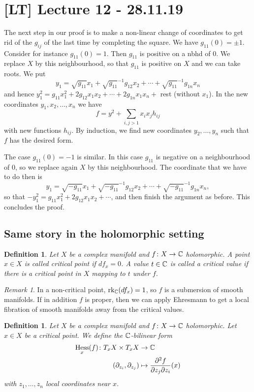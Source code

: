 \documentclass[A4paper, british, reqno]{amsart}
\theoremstyle{darkgreentheorem}
\theoremstyle{darkbluedefinition}
\newtheorem{defn}[thm]{Definition}
\theoremstyle{darkredexample}
\theoremstyle{remark}
\newtheorem{rem}[thm]{Remark}
\DeclareMathOperator{\rk}{rk}
\DeclareMathOperator{\Hess}{Hess}
\newcommand{\1}{\mathbbm{1}}
\begin{document}
\section{[LT] Lecture 12 - 28.11.19}

The next step in our proof is to make a non-linear change of coordinates to get rid of the $g_{ij}$ of the last time by completing the square.
We have $g_{11}(0)=\pm 1$.
Consider for instance $g_{11}(0)=1$.
Then $g_{11}$ is positive on a nbhd of $0$.
We replace $X$ by this neighbourhood, so that $g_{11}$ is positive on $X$ and we can take roots.
We put
\[ y_{1}=\sqrt{g_{11}}x_{1}+\sqrt{g_{11}}^{-1}g_{12}x_{2}+\cdots +\sqrt{g_{11}}^{-1}g_{1n}x_{n} \]
and hence $y_{1}^{2}=g_{11}x_{1}^{2}+2g_{12}x_{1}x_{2}+\cdots +2g_{1n}x_{1}x_{n}+$ rest (without $x_{1}$).
In the new coordinates $y_{1},x_{2},\ldots,x_{n}$ we have
\[ f=y^{2}+\sum_{i,j>1} x_{i}x_{j}h_{ij} \]
with new functions $h_{ij}$.
By induction, we find new coordinates $y_{2},\ldots,y_{n}$ such that $f$ has the desired form.

The case $g_{11}(0)=-1$ is similar.
In this case $g_{11}$ is negative on a neighbourhood of $0$, so we replace again $X$ by this neighbourhood.
The coordinate that we have to do then is
\[ y_{1}=\sqrt{-g_{11}}x_{1}+\sqrt{-g_{11}}^{-1}g_{12}x_{2}+\cdots +\sqrt{-g_{11}}^{-1}g_{1n}x_{n}, \]
so that $-y_{1}^{2}=g_{11}x_{1}^{2}+2g_{12}x_{1}x_{2}+\cdots$, and then finish the argument as before.
This concludes the proof.

\subsection{Same story in the holomorphic setting}

\begin{defn}
    Let $X$ be a complex manifold and $f\colon X\to \mathbb{C}$ holomorphic.
    A point $x\in X$ is called \textit{critical point} if $df_{x}=0$.
    A value $t\in \mathbb{C}$ is called a \textit{critical value} if there is a critical point in $X$ mapping to $t$ under $f$.
\end{defn}

\begin{rem}
    In a non-critical point, $\rk_{\C}(df_{x})=1$, so $f$ is a submersion of smooth manifolds.
    If in addition $f$ is proper, then we can apply Ehresmann to get a local fibration of smooth manifolds away from the critical values.
\end{rem}

\begin{defn}
    Let $X$ be a complex manifold and $f\colon X\to \mathbb{C}$ holomorphic.
    Let $x\in X$ be a critical point.
    We define the $\mathbb{C}$-bilinear form
    \begin{align*}
	\Hess_{x}(f)\colon T_{x}X\times T_{x}X & \to \C \\
	(\partial_{z_{i}},\partial_{z_{j}}) & \mapsto \frac{\partial^{2} f}{\partial z_{j}\partial z_{i}}(x)
    \end{align*}
    with $z_{1},\ldots,z_{n}$ local coordinates near $x$.
\end{defn}
\end{document}
